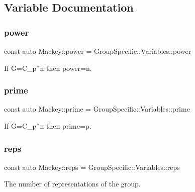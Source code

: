 \subsection{Variable Documentation}
\mbox{\label{namespaceMackey_aafdaaabd06dd9ceefe6fa4f26d13a60d}} 
\subsubsection{\texorpdfstring{power}{power}}
{\footnotesize\ttfamily const auto Mackey\+::power = Group\+Specific\+::\+Variables\+::power}



If G=C\+\_\+p$^\wedge$n then power=n. 

\mbox{\label{namespaceMackey_a77e059c6f9b4c6ea096fcf94a7880bc3}} 
\subsubsection{\texorpdfstring{prime}{prime}}
{\footnotesize\ttfamily const auto Mackey\+::prime = Group\+Specific\+::\+Variables\+::prime}



If G=C\+\_\+p$^\wedge$n then prime=p. 

\mbox{\label{namespaceMackey_af282e8433677f2812cb242359f4cd0c1}} 
\subsubsection{\texorpdfstring{reps}{reps}}
{\footnotesize\ttfamily const auto Mackey\+::reps = Group\+Specific\+::\+Variables\+::reps}



The number of representations of the group. 

